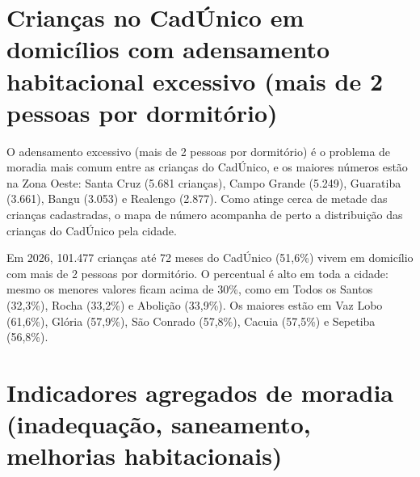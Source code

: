 
\section{Crianças no CadÚnico em domicílios com adensamento habitacional excessivo (mais de 2 pessoas por dormitório)}


O adensamento excessivo (mais de 2 pessoas por dormitório) é o problema de moradia mais comum entre as crianças do CadÚnico, e os maiores números estão na Zona Oeste: Santa Cruz (5.681 crianças), Campo Grande (5.249), Guaratiba (3.661), Bangu (3.053) e Realengo (2.877). Como atinge cerca de metade das crianças cadastradas, o mapa de número acompanha de perto a distribuição das crianças do CadÚnico pela cidade.


Em 2026, 101.477 crianças até 72 meses do CadÚnico (51,6\%) vivem em domicílio com mais de 2 pessoas por dormitório. O percentual é alto em toda a cidade: mesmo os menores valores ficam acima de 30\%, como em Todos os Santos (32,3\%), Rocha (33,2\%) e Abolição (33,9\%). Os maiores estão em Vaz Lobo (61,6\%), Glória (57,9\%), São Conrado (57,8\%), Cacuia (57,5\%) e Sepetiba (56,8\%).


\section{Indicadores agregados de moradia (inadequação, saneamento, melhorias habitacionais)}

